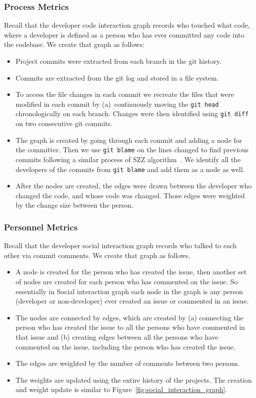 \documentclass[sigconf,review]{acmart}
\newcommand{\bi}{\begin{itemize}}
\newcommand{\ei}{\end{itemize}}
\begin{document}
\subsubsection{Process Metrics}
\label{sec:process metrics}
Recall that the  developer code interaction graph records who touched what code, where a developer is defined as a person who has ever committed any code into the codebase. We create that graph as follows:
\bi
\item
Project   commits  were extracted from each branch in the git history. 
\item
Commits are extracted from the git log and stored in a file system.
\item
To access the file changes in each commit we recreate the files that were modified in each commit by (a)~continuously moving the {\tt git head} chronologically on each branch. Changes were then   identified  using {\tt git diff} on two consecutive git commits.
\item
The graph is created by going through each commit and adding a node for the committer. Then we use {\tt git blame} on the lines changed to find previous commits following a similar process of SZZ algorithm~\cite{williams2008szz}. We identify all the developers of the commits from {\tt git blame} and add them as a node as well.
\item
After the nodes are created, the edges were drawn between the developer who changed the code, and whose code was changed. Those  edges were weighted by the change size between the person. 
\ei




\subsubsection{Personnel Metrics}
\label{sec:Personnel Metrics}

Recall that the  developer social interaction graph records who talked to each other via commit comments. We create that graph as follows.

\bi
\item
 A node is created for the person who has created the issue, then another set of nodes are created for each person who has commented on the issue. So essentially in Social interaction graph each node in the graph is any person (developer or non-developer) ever created an issue or commented in an issue.
 \item
 The nodes are connected by edges, which are created by (a) connecting the person who has created the issue to all the persons who have commented in that issue and (b) creating edges between all the persons who have commented on the issue, including the person who has created the issue. 
 \item
 The edges are weighted by the number of comments between two persons. 
 \item
 The weights are updated using the entire history of the projects. The creation and weight update is similar to Figure~\ref{fig:social_interaction_graph}.
 \ei
\end{document}
